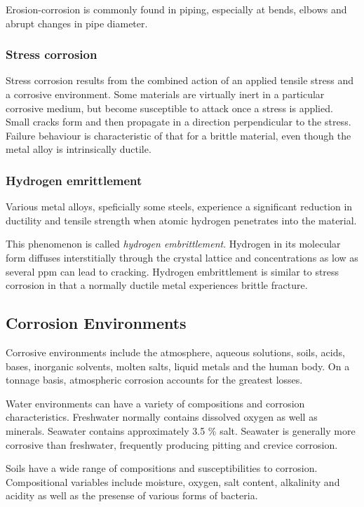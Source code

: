 Erosion-corrosion is commonly found in piping, especially at bends, elbows and abrupt changes in pipe diameter.

\subsubsection{Stress corrosion}
Stress corrosion results from the combined action of an applied tensile stress and a corrosive environment. Some materials are virtually inert in a particular corrosive medium, but become susceptible to attack once a stress is applied. Small cracks form and then propagate in a direction perpendicular to the stress. Failure behaviour is characteristic of that for a brittle material, even though the metal alloy is intrinsically ductile.


\subsubsection{Hydrogen emrittlement}
Various metal alloys, speficially some steels, experience a significant reduction in ductility and tensile strength when atomic hydrogen penetrates into the material.

This phenomenon is called \textit{hydrogen embrittlement}. Hydrogen in its molecular form diffuses interstitially through the crystal lattice and concentrations as low as several ppm can lead to cracking. Hydrogen embrittlement is similar to stress corrosion in that a normally ductile metal experiences brittle fracture.


\subsection{Corrosion Environments}
Corrosive environments include the atmosphere, aqueous solutions, soils, acids, bases, inorganic solvents, molten salts, liquid metals and the human body. On a tonnage basis, atmospheric corrosion accounts for the greatest losses.

Water environments can have a variety of compositions and corrosion characteristics. Freshwater normally contains dissolved oxygen as well as minerals. Seawater contains approximately \num{3,5} \% salt. Seawater is generally more corrosive than freshwater, frequently producing pitting and crevice corrosion. 

Soils have a wide range of compositions and susceptibilities to corrosion. Compositional variables include moisture, oxygen, salt content, alkalinity and acidity as well as the presense of various forms of bacteria.


